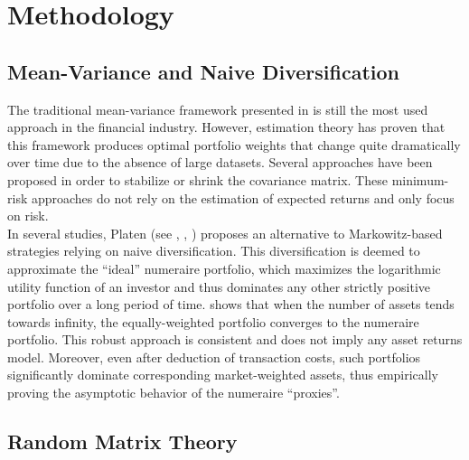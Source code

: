 \section{Methodology}


\subsection{Mean-Variance and Naive Diversification}\label{naive}

The traditional mean-variance framework presented in \cite{Markowitz1952} is still the most used approach in the financial industry. However, estimation theory has proven that this framework produces optimal portfolio weights that change quite dramatically over time due to the absence of large datasets. Several approaches have been proposed in order to stabilize or shrink the covariance matrix. These minimum-risk approaches do not rely on the estimation of expected returns and only focus on risk.  \\

In several studies, Platen (see \cite{Platen2006}, \cite{Platen2009}, \cite{Platen2010}) proposes an alternative to Markowitz-based strategies relying on naive diversification. This diversification is deemed to approximate the ``ideal'' numeraire portfolio, which maximizes the logarithmic utility function of an investor and thus dominates any other strictly positive portfolio over a long period of time.  \cite{Platen2010} shows that when the number of assets tends towards infinity, the equally-weighted portfolio converges to the numeraire portfolio. This robust approach is consistent and does not imply any asset returns model. 
Moreover, even after deduction of transaction costs, such portfolios significantly dominate corresponding market-weighted assets, thus empirically proving the asymptotic behavior of the numeraire ``proxies''.


\subsection{Random Matrix Theory}\label{sec:RMT}

